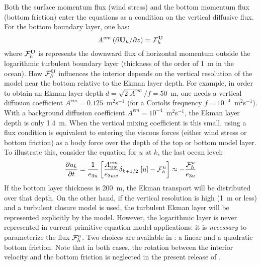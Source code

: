 \documentclass[../main/NEMO_manual]{subfiles}
\begin{document}
Both the surface momentum flux (wind stress) and the bottom momentum flux (bottom friction) enter the equations as
a condition on the vertical diffusive flux.
For the bottom boundary layer, one has:
 \[
   A^{vm} \left( \partial {\textbf U}_h / \partial z \right) = {{\cal F}}_h^{\textbf U}
 \]
where ${\cal F}_h^{\textbf U}$ is represents the downward flux of horizontal momentum outside
the logarithmic turbulent boundary layer (thickness of the order of 1~m in the ocean).
How ${\cal F}_h^{\textbf U}$ influences the interior depends on the vertical resolution of the model near
the bottom relative to the Ekman layer depth.
For example, in order to obtain an Ekman layer depth $d = \sqrt{2\;A^{vm}} / f = 50$~m,
one needs a vertical diffusion coefficient $A^{vm} = 0.125$~m$^2$s$^{-1}$
(for a Coriolis frequency $f = 10^{-4}$~m$^2$s$^{-1}$).
With a background diffusion coefficient $A^{vm} = 10^{-4}$~m$^2$s$^{-1}$, the Ekman layer depth is only 1.4~m.
When the vertical mixing coefficient is this small, using a flux condition is equivalent to
entering the viscous forces (either wind stress or bottom friction) as a body force over the depth of the top or
bottom model layer.
To illustrate this, consider the equation for $u$ at $k$, the last ocean level:
\begin{equation}
  \label{eq:ZDF_drg_flux2}
  \frac{\partial u_k}{\partial t} = \frac{1}{e_{3u}} \left[ \frac{A_{uw}^{vm}}{e_{3uw}} \delta_{k+1/2}\;[u] - {\cal F}^u_h \right] \approx - \frac{{\cal F}^u_{h}}{e_{3u}}
\end{equation}
If the bottom layer thickness is 200~m, the Ekman transport will be distributed over that depth.
On the other hand, if the vertical resolution is high (1~m or less) and a turbulent closure model is used,
the turbulent Ekman layer will be represented explicitly by the model.
However, the logarithmic layer is never represented in current primitive equation model applications:
it is \emph{necessary} to parameterize the flux ${\cal F}^u_h $.
Two choices are available in \NEMO: a linear and a quadratic bottom friction.
Note that in both cases, the rotation between the interior velocity and the bottom friction is neglected in
the present release of \NEMO.
\end{document}
